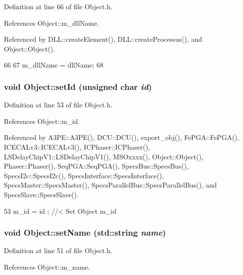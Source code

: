 Definition at line 66 of file Object.h.

References Object::m\_\-dllName.

Referenced by DLL::createElement(), DLL::createProcessus(), and Object::Object().


\begin{DoxyCode}
66                                       {
67     m_dllName = dllName;
68   }
\end{DoxyCode}
\hypertarget{classObject_a398fe08cba594a0ce6891d59fe4f159f}{
\subsubsection[{setId}]{\setlength{\rightskip}{0pt plus 5cm}void Object::setId (unsigned char {\em id})}}
\label{classObject_a398fe08cba594a0ce6891d59fe4f159f}


Definition at line 53 of file Object.h.

References Object::m\_\-id.

Referenced by A3PE::A3PE(), DCU::DCU(), export\_\-obj(), FePGA::FePGA(), ICECALv3::ICECALv3(), ICPhaser::ICPhaser(), LSDelayChipV1::LSDelayChipV1(), MSOxxxx(), Object::Object(), Phaser::Phaser(), SeqPGA::SeqPGA(), SpecsBus::SpecsBus(), SpecsI2c::SpecsI2c(), SpecsInterface::SpecsInterface(), SpecsMaster::SpecsMaster(), SpecsParallelBus::SpecsParallelBus(), and SpecsSlave::SpecsSlave().


\begin{DoxyCode}
53 { m_id    = id    ; } //< Set Object m_id
\end{DoxyCode}
\hypertarget{classObject_ae30fea75683c2d149b6b6d17c09ecd0c}{
\subsubsection[{setName}]{\setlength{\rightskip}{0pt plus 5cm}void Object::setName (std::string {\em name})}}
\label{classObject_ae30fea75683c2d149b6b6d17c09ecd0c}


Definition at line 51 of file Object.h.

References Object::m\_\-name.

